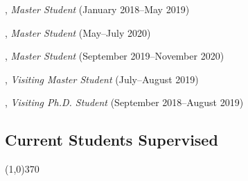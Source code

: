 \documentclass[10pt]{article}
\newenvironment{myindentpar}[1]%
{\begin{list}{}%
         {\setlength{\leftmargin}{#1}}%
         \item[]%
}
{\end{list}}
\newcounter{list}
\begin{document}
\begin{myindentpar}{0.75cm}
\hspace{-0.75cm}{\bf Xueying Wang}, \textit{Master Student} (January 2018--May 2019)

\hspace{-0.75cm}{\bf Bhakti Sharma}, \textit{Master Student} (May--July 2020)

\hspace{-0.75cm}{\bf Jianing Li}, \textit{Master Student} (September 2019--November 2020)

\hspace{-0.75cm}{\bf Zijian Hu}, \textit{Visiting Master Student} (July--August 2019)

\hspace{-0.75cm}{\bf Tianwen Jiang}, \textit{Visiting Ph.D. Student} (September 2018--August 2019)

\end{myindentpar}

\subsection{\sc Current Students Supervised}
\vspace{-0.4cm} \line(1,0){370} \vspace{-0.1cm}
\end{document}
